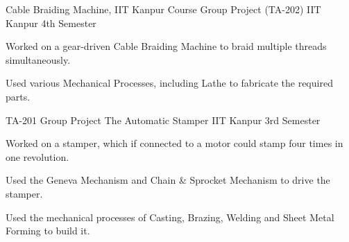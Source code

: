 \begin{cventries}

  \cventry
  {Cable Braiding Machine, IIT Kanpur}
  {Course Group Project (TA-202)}
  {IIT Kanpur}
  {4th Semester}
  {
    \begin{cvitems}
		\item Worked on a gear-driven Cable Braiding Machine to braid multiple threads simultaneously.
		\item Used various Mechanical Processes, including Lathe to fabricate the required parts. 
	\end{cvitems}
  }
  
  	\cventry
  {TA-201 Group Project}
	{The Automatic Stamper}
  {IIT Kanpur}
  {3rd Semester}
  {
    \begin{cvitems}
    \item Worked on a stamper, which if connected to a motor could stamp four times in one revolution.
	\item Used the Geneva Mechanism and Chain \& Sprocket Mechanism to drive the stamper.
    \item Used the mechanical processes of Casting, Brazing, Welding and Sheet Metal Forming to build it.
    \end{cvitems}
  }

\end{cventries}

